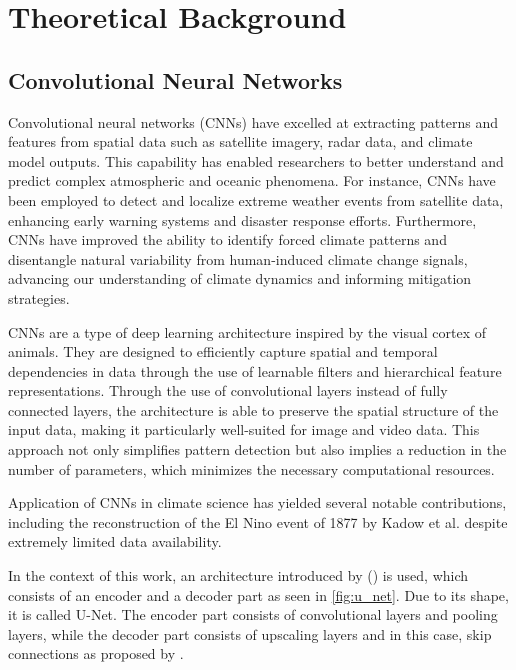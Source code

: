 \section{Theoretical Background}
\label{sec:theory}

\subsection{Convolutional Neural Networks}
\label{subsec:cnn}

Convolutional neural networks (CNNs) have excelled at extracting patterns and features from spatial data such as satellite imagery, radar data, and climate model outputs. This capability has enabled researchers to better understand and predict complex atmospheric and oceanic phenomena. For instance, CNNs have been employed to detect and localize extreme weather events from satellite data, enhancing early warning systems and disaster response efforts. Furthermore, CNNs have improved the ability to identify forced climate patterns and disentangle natural variability from human-induced climate change signals, advancing our understanding of climate dynamics and informing mitigation strategies.


CNNs are a type of deep learning architecture inspired by the visual cortex of animals. They are designed to efficiently capture spatial and temporal dependencies in data through the use of learnable filters and hierarchical feature representations. Through the use of convolutional layers instead of fully connected layers, the architecture is able to preserve the spatial structure of the input data, making it particularly well-suited for image and video data. This approach not only simplifies pattern detection but also implies a reduction in the number of parameters, which minimizes the necessary computational resources.

Application of CNNs in climate science has yielded several notable contributions, including the reconstruction of the El Nino event of 1877 by Kadow et al. despite extremely limited data availability. \cite{kadow2020}

In the context of this work, an architecture introduced by (\cite{ronneberger2015}) is used, which consists of an encoder and a decoder part as seen in \autoref{fig:u_net}. Due to its shape, it is called U-Net. The encoder part consists of convolutional layers and pooling layers, while the decoder part consists of upscaling layers and in this case, skip connections as proposed by \cite{liu2018inpaining}.

